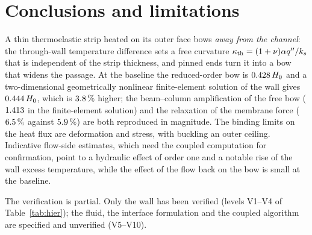 \section{Conclusions and limitations}
\label{sec:conclusions}

A thin thermoelastic strip heated on its outer face bows \emph{away from the channel}: the through-wall
temperature difference sets a free curvature $\kappa_{\mathrm{th}}=(1+\nu)\alpha q^{\prime\prime}/k_s$ that is independent of the strip thickness,
and pinned ends turn it into a bow that widens the passage. At the baseline the reduced-order bow is
$0.428\,H_0$ and a two-dimensional geometrically nonlinear finite-element solution of the wall gives
$0.444\,H_0$, which is $3.8\,\%$ higher; the beam--column amplification of the free bow
($1.413$ in the finite-element solution) and the relaxation of the membrane force
($6.5\,\%$ against $5.9\,\%$) are both reproduced in magnitude. The binding limits on the heat flux are
deformation and stress, with buckling an outer ceiling. Indicative flow-side estimates, which need the coupled
computation for confirmation, point to a hydraulic effect of order one and a notable rise of the wall excess
temperature, while the effect of the flow back on the bow is small at the baseline.

The verification is partial. Only the wall has been verified (levels V1--V4 of Table~\ref{tab:hier}); the
fluid, the interface formulation and the coupled algorithm are specified and unverified (V5--V10).

